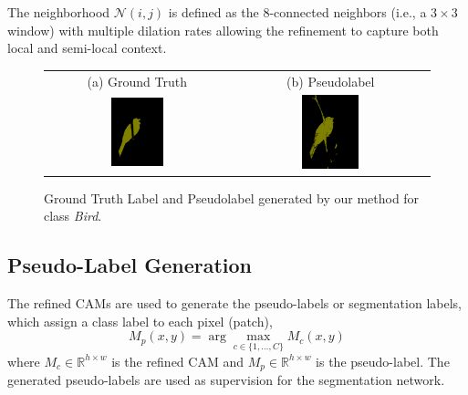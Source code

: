 The neighborhood \( \mathcal{N}(i, j) \) is defined as the 8-connected neighbors (i.e., a \(3\times{3}\) window) with multiple dilation rates  allowing the refinement to capture both local and semi-local context.

\begin{figure}[ht]
  \centering
  \setlength{\tabcolsep}{2pt} %
  \renewcommand{\arraystretch}{0.9}
    \centering
    \begin{tabular}{c c} %

    (a) Ground Truth & (b) Pseudolabel \\
    [1mm]
    \includegraphics[width=0.3\textwidth,height=0.3\textwidth]{figures/colored_gts/2009_004084}
    & 
    \includegraphics[width=0.3\textwidth,height=0.3\textwidth]{figures/test_labels/ours/2009_004084_[2]}
    \\
  \end{tabular}

  \caption{Ground Truth Label and Pseudolabel generated by our method for class \textit{Bird}.}
  \label{fig:pseudolabel_examples}
\end{figure}


\subsection{Pseudo-Label Generation}
\label{subsec:pseudo_label_generation}
The refined CAMs are used to generate the pseudo-labels or segmentation labels, which assign a class label to each pixel (patch),
\begin{equation}
    M_p(x, y) = \arg\max_{c \in \{1, \ldots, C\}} M_c(x, y)
\end{equation}
where \( M_c \in \mathbb{R}^{h \times w} \) is the refined CAM and \( M_p \in \mathbb{R}^{h \times w} \) is the pseudo-label.
The generated pseudo-labels are used as supervision for the segmentation network.



